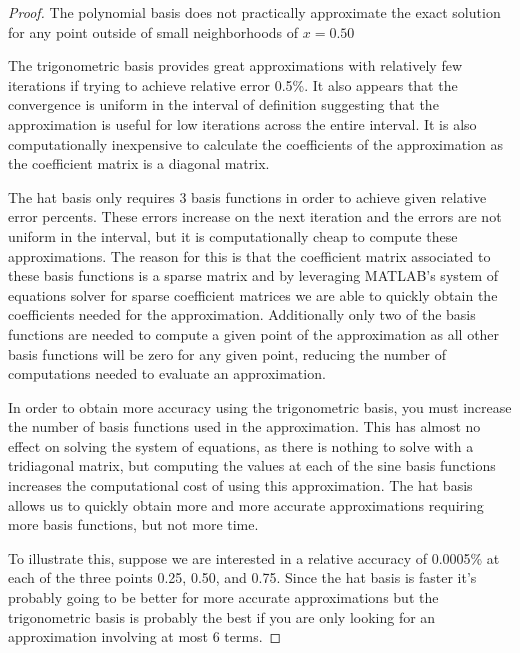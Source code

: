 \begin{problem}
\end{problem}

\begin{proof}
  The polynomial basis does not practically approximate the exact solution for any
  point outside of small neighborhoods of $x=0.50$

  The trigonometric basis provides great approximations with relatively few iterations
  if trying to achieve relative error 0.5\%. It also appears that the convergence is
  uniform in the interval of definition suggesting that the approximation is useful
  for low iterations across the entire interval. It is also computationally inexpensive
  to calculate the coefficients of the approximation as the coefficient matrix is a
  diagonal matrix.

  The hat basis only requires 3 basis functions in order to achieve given relative error percents.
  These errors increase on the next iteration and the errors are not uniform in the
  interval, but it is computationally cheap to
  compute these approximations. The reason for this is that the coefficient matrix
  associated to these basis functions is a sparse matrix and by leveraging MATLAB's system of
  equations solver for sparse coefficient matrices we are able to quickly obtain the
  coefficients needed for the approximation. Additionally only two of the basis functions
  are needed to compute a given point of the approximation as all other basis
  functions will be zero for any given point, reducing the number of computations
  needed to evaluate an approximation.

  In order to obtain more accuracy using the trigonometric basis, you must increase
  the number of basis functions used in the approximation. This has almost no effect on
  solving the system of equations, as there is nothing to solve with a tridiagonal matrix,
  but computing the values at each of the sine basis functions increases the computational
  cost of using this approximation. The hat basis allows us to quickly obtain
  more and more accurate approximations requiring more basis functions, but not more time.

  To illustrate this, suppose we are interested in a relative accuracy of 0.0005\%
  at each of the three points 0.25, 0.50, and 0.75.
  Since the hat basis is faster it's probably going to be better for more accurate
  approximations but the trigonometric basis is probably the best if you are only
  looking for an approximation involving at most 6 terms.
\end{proof}
